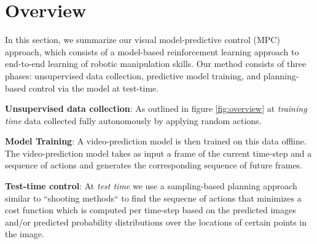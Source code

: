 \section{Overview}\label{sec:prelim}
\label{sec:vmpc}

In this section, we summarize our visual model-predictive control (MPC) approach, which consists of a model-based reinforcement learning approach to end-to-end learning of robotic manipulation skills. Our method consists of three phases: unsupervised data collection, predictive model training, and planning-based control via the model at test-time.

\textbf{Unsupervised data collection}: As outlined in figure \ref{fig:overview} at \emph{training time} data collected fully autonomously by applying random actions.

\textbf{Model Training}: A video-prediction model is then trained on this data offline. The video-prediction model takes as input a frame of the current time-step and a sequence of actions and generates the corresponding sequence of future frames. 

\textbf{Test-time control}: At \emph{test time} we use a sampling-based planning approach similar to ``shooting methods`` to find the sequecne of actions that minimizes a cost function which is computed per time-step based on the predicted images and/or predicted probability distributions over the locations of certain points in the image.

